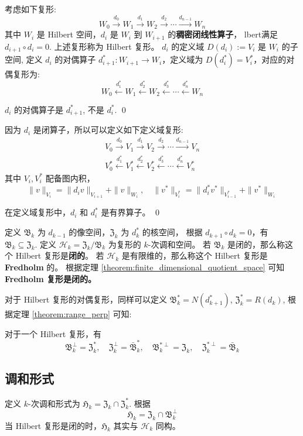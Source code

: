 \documentclass[lang=cn,a4paper,newtx]{elegantpaper}
\begin{document}
考虑如下复形:
$$
W_0 \xrightarrow{d_0} W_1 \xrightarrow{d_1} W_2 \xrightarrow{d_2} \cdots
\xrightarrow{d_{n-1}} W_n
$$
其中 $W_i$ 是 Hilbert 空间，$d_i$ 是 $W_i$ 到 $W_{i+1}$
的\textbf{稠密闭线性算子}，
lbert满足 $d_{i+1} \circ d_i = 0$. 上述复形称为 Hilbert 复形。
$d_i$ 的定义域 $D(d_i) := V_i$ 是 $W_i$ 的子空间, 定义 $d_i$ 的对偶算子
$d_{i+1}^* : W_{i+1} \to W_i$，定义域为 $D(d_i^*) = V_i^*$，对应的对偶复形为:
$$
W_0 \xleftarrow{d_1^*} W_1 \xleftarrow{d_2^*} W_2 \xleftarrow{d_3^*} \cdots
\xleftarrow{d_{n}^*} W_n
$$
\begin{note}
    $d_i$ 的对偶算子是 $d_{i+1}^*$, 不是 $d_i^*$.
\qed
\end{note}
因为 $d_i$ 是闭算子，所以可以定义如下定义域复形:
$$
\begin{aligned}
V_0 \xrightarrow{d_0} V_1 \xrightarrow{d_1} V_2 \xrightarrow{d_2} \cdots
\xrightarrow{d_{n-1}} V_n\\
V_0^* \xleftarrow{d_1^*} V_1^* \xleftarrow{d_2^*} V_2^* \xleftarrow{d_3^*} \cdots 
\xleftarrow{d_{n}^*} V_n^*
\end{aligned}
$$
其中 $V_i, V_i^*$ 配备图内积，
$$
\|v\|_{V_i} = \|d_i v\|_{V_{i+1}} + \|v\|_{W_i}, \quad
\|v^*\|_{V_i^*} = \|d_i^* v^*\|_{V_{i-1}^*} + \|v^*\|_{W_i}
$$
\begin{note}
    在定义域复形中，$d_i$ 和 $d_i^*$ 是有界算子。
\qed
\end{note}
定义 $\mathfrak{B}_k$ 为 $d_{k-1}$ 的像空间，$\mathfrak{Z}_k$ 为 $d_{k}^*$ 的核空间，
根据 $d_{k+1} \circ d_k = 0$，有 $\mathfrak{B}_k \subseteq \mathfrak{Z}_{k}$.
定义
$\mathcal{H}_k = \mathfrak{Z}_k/\mathfrak{B}_{k}$ 为复形的 $k$-次调和空间。
若 $\mathfrak{B}_k$ 是闭的，那么称这个 Hilbert 复形是\textbf{闭的}。
若 $\mathcal{H}_k$ 是有限维的，那么称这个 Hilbert 复形是 \textbf{Fredholm} 的。
根据定理 \ref{theorem:finite_dimensional_quotient_space} 可知 \textbf{Fredholm
复形是闭的。}

对于 Hilbert 复形的对偶复形，同样可以定义 
$\mathfrak{B}_k^* = N(d_{k+1}^*)$, 
$\mathfrak{Z}_k^* = R(d_k)$, 
根据定理 \ref{theorem:range_perp} 可知:
\begin{theorem}
对于一个 Hilbert 复形，有
$$
\mathfrak{B}_k^{\perp} = \mathfrak{Z}_{k}^*, \quad \mathfrak{Z}_k^{\perp} =
\mathfrak{\bar B}_{k}^*,\quad 
\mathfrak{B}_k^{*\perp} = \mathfrak{Z}_{k}, \quad \mathfrak{Z}_k^{*\perp} =
\mathfrak{\bar B}_{k}
$$
\end{theorem}
\subsection{调和形式}
定义 $k$-次调和形式为 $\mathfrak{H}_k = \mathfrak{Z}_k \cap \mathfrak{Z}_k^*$.
根据
$$
\mathfrak{H}_k = \mathfrak{Z}_k \cap \mathfrak{B}_{k}^{\perp}
$$
当 Hilbert 复形是闭的时，$\mathfrak{H}_k$ 其实与 $\mathcal{H}_k$ 同构。
\end{document}
